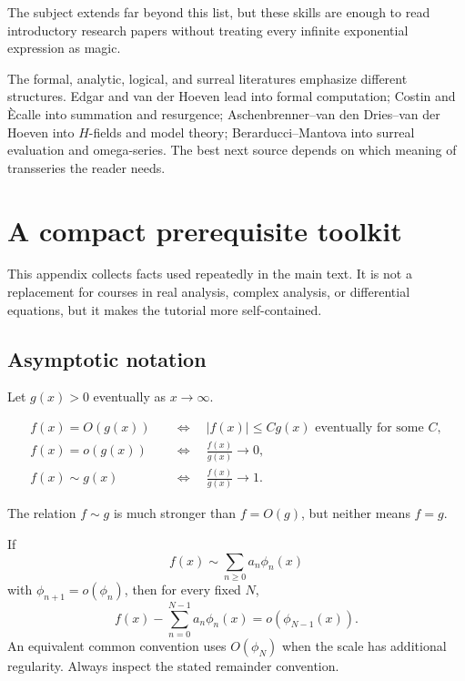 \documentclass[11pt,openany]{book}
\theoremstyle{definition}
\theoremstyle{plain}
\theoremstyle{remark}
\newcommand{\asym}{\sim}
\begin{document}
The subject extends far beyond this list, but these skills are enough to read introductory research papers without treating every infinite exponential expression as magic.

\begin{summarybox}
The formal, analytic, logical, and surreal literatures emphasize different structures. Edgar and van der Hoeven lead into formal computation; Costin and \`Ecalle into summation and resurgence; Aschenbrenner--van den Dries--van der Hoeven into $H$-fields and model theory; Berarducci--Mantova into surreal evaluation and omega-series. The best next source depends on which meaning of transseries the reader needs.
\end{summarybox}

\appendix

\chapter{A compact prerequisite toolkit}\label{app:toolkit}

This appendix collects facts used repeatedly in the main text. It is not a replacement for courses in real analysis, complex analysis, or differential equations, but it makes the tutorial more self-contained.

\section{Asymptotic notation}

Let $g(x)>0$ eventually as $x\to\infty$.

\begin{align*}
 f(x)=O(g(x))
 &\quad\Longleftrightarrow\quad
 |f(x)|\le Cg(x)\text{ eventually for some }C,\\
 f(x)=o(g(x))
 &\quad\Longleftrightarrow\quad
 \frac{f(x)}{g(x)}\longrightarrow0,\\
 f(x)\sim g(x)
 &\quad\Longleftrightarrow\quad
 \frac{f(x)}{g(x)}\longrightarrow1.
\end{align*}

The relation $f\sim g$ is much stronger than $f=O(g)$, but neither means $f=g$.

If
\[
 f(x)\asym\sum_{n\ge0}a_n\phi_n(x)
\]
with $\phi_{n+1}=o(\phi_n)$, then for every fixed $N$,
\[
 f(x)-\sum_{n=0}^{N-1}a_n\phi_n(x)
 =o(\phi_{N-1}(x)).
\]
An equivalent common convention uses $O(\phi_N)$ when the scale has additional regularity. Always inspect the stated remainder convention.
\end{document}
